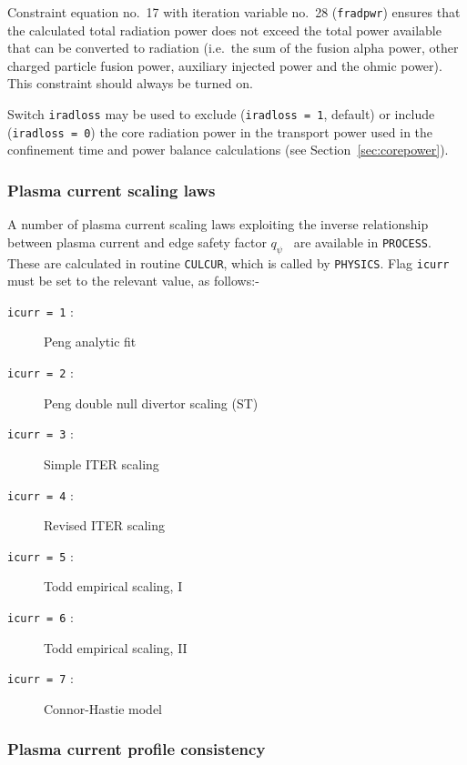 \documentclass[11pt,a4paper]{report}
\newcommand{\process}{\mbox{\texttt{PROCESS}}}
\begin{document}


Constraint equation no.~17 with iteration variable no.~28 (\texttt{fradpwr})
ensures that the calculated total radiation power does not exceed the total
power available that can be converted to radiation (i.e.\ the sum of the fusion
alpha power, other charged particle fusion power, auxiliary injected power and
the ohmic power). This constraint should always be turned on.

Switch \texttt{iradloss} may be used to exclude (\texttt{iradloss = 1},
default) or include (\texttt{iradloss = 0}) the core radiation power in the
transport power used in the confinement time and power balance calculations
(see Section~\ref{sec:corepower}).

\subsubsection{Plasma current scaling laws}
\label{sec:current_scaling}

A number of plasma current scaling laws exploiting the inverse relationship
between plasma current and edge safety factor $q_{\psi}$~\cite{172} are
available in \process. These are calculated in routine \texttt{CULCUR}, which
is called by \texttt{PHYSICS}.  Flag \texttt{icurr} must be set to the
relevant value, as follows:-
\begin{description}
\item [\texttt{icurr = 1} :] Peng analytic fit
\item [\texttt{icurr = 2} :] Peng double null divertor scaling (ST)~\cite{storac}
\item [\texttt{icurr = 3} :] Simple ITER scaling
\item [\texttt{icurr = 4} :] Revised ITER scaling~\cite{Uckan88}
\item [\texttt{icurr = 5} :] Todd empirical scaling, I
\item [\texttt{icurr = 6} :] Todd empirical scaling, II
\item [\texttt{icurr = 7} :] Connor-Hastie model
\end{description}

\subsubsection{Plasma current profile consistency}
\label{sec:current_profile}
\end{document}
